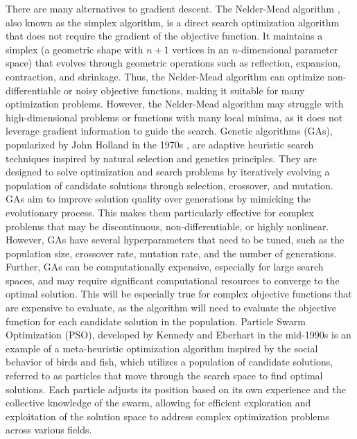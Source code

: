 \documentclass{article}[11pt]
\begin{document}
There are many alternatives to gradient descent. The Nelder-Mead algorithm \cite{NelderMead-1965}, also known as the simplex algorithm, is a direct search optimization algorithm that does not require the gradient of the objective function.
It maintains a simplex (a geometric shape with $n+1$ vertices in an $n$-dimensional parameter space) that evolves through geometric operations such as reflection, expansion, contraction, and shrinkage.
Thus, the Nelder-Mead algorithm can optimize non-differentiable or noisy objective functions, making it suitable for many optimization problems.
However, the Nelder-Mead algorithm may struggle with high-dimensional problems or functions with many local minima, as it does not leverage gradient information to guide the search.
Genetic algorithms (GAs), popularized by John Holland in the 1970s \cite{Holland:1975aa}, are adaptive heuristic search techniques inspired by natural selection and genetics principles. 
They are designed to solve optimization and search problems by iteratively evolving a population of candidate solutions through selection, crossover, and mutation. 
GAs aim to improve solution quality over generations by mimicking the evolutionary process. This makes them particularly effective for complex problems that may be discontinuous, non-differentiable, or highly nonlinear.
However, GAs have several hyperparameters that need to be tuned, such as the population size, crossover rate, mutation rate, and the number of generations.
Further, GAs can be computationally expensive, especially for large search spaces, and may require significant computational resources to converge to the optimal solution.
This will be especially true for complex objective functions that are expensive to evaluate, as the algorithm will need to evaluate the objective function for each candidate solution in the population.
Particle Swarm Optimization (PSO), developed by Kennedy and Eberhart in the mid-1990s \cite{PSO1995} is an example of a meta-heuristic optimization algorithm inspired by the social behavior of birds and fish, which utilizes a population of candidate solutions, 
referred to as particles that move through the search space to find optimal solutions. 
Each particle adjusts its position based on its own experience and the collective knowledge of the swarm, allowing for efficient exploration and exploitation of the solution space to address complex optimization problems across various fields.
\end{document}
